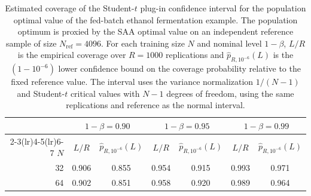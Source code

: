 \begin{table}[t]
  \centering
  \caption{Estimated coverage of the Student-$t$ plug-in confidence interval for the population optimal value of the fed-batch ethanol fermentation example. The population optimum is proxied by the SAA optimal value on an independent reference sample of size $N_{\mathrm{ref}}=4096$. For each training size $N$ and nominal level $1-\beta$, $L/R$ is the empirical coverage over $R=1000$ replications and $\widehat p_{R,10^{-6}}(L)$ is the $(1-10^{-6})$ lower confidence bound on the coverage probability relative to the fixed reference value. The interval uses the variance normalization $1/(N-1)$ and Student-$t$ critical values with $N-1$ degrees of freedom, using the same replications and reference as the normal interval.}
  \begin{tabular}{rcccccc}
    \toprule
     & \multicolumn{2}{c}{$1-\beta = 0.90$} & \multicolumn{2}{c}{$1-\beta = 0.95$} & \multicolumn{2}{c}{$1-\beta = 0.99$} \\
    \cmidrule(lr){2-3}\cmidrule(lr){4-5}\cmidrule(lr){6-7}
    $N$ & $L/R$ & $\widehat p_{R,10^{-6}}(L)$ & $L/R$ & $\widehat p_{R,10^{-6}}(L)$ & $L/R$ & $\widehat p_{R,10^{-6}}(L)$ \\
    \midrule
    32 & 0.906 & 0.855 & 0.954 & 0.915 & 0.993 & 0.971 \\
    64 & 0.902 & 0.851 & 0.958 & 0.920 & 0.989 & 0.964 \\
    \bottomrule
  \end{tabular}
  \label{table:ethanol-coverage-t}
\end{table}
